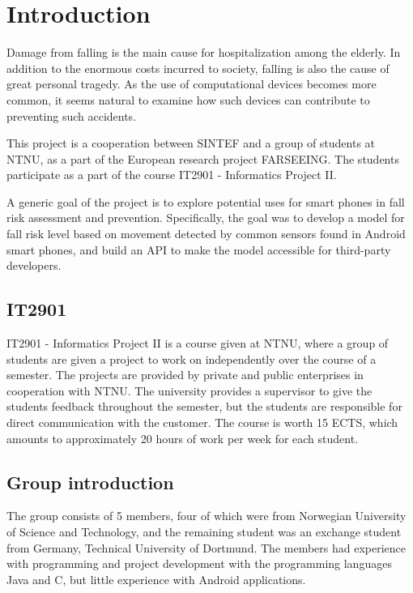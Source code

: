 \chapter{Introduction}

Damage from falling is the main cause for hospitalization among the elderly. In addition to the enormous costs incurred to society, falling is also the cause of great personal tragedy. As the use of computational devices becomes more common, it seems natural to examine how such devices can contribute to preventing such accidents.

This project is a cooperation between SINTEF and a group of students at NTNU, as a part of the European research project FARSEEING. The students participate as a part of the course IT2901 - Informatics Project II.

A generic goal of the project is to explore potential uses for smart phones in fall risk assessment and prevention. Specifically, the goal was to develop a model for fall risk level based on movement detected by common sensors found in Android smart phones, and build an API to make the model accessible for third-party developers.



\section{IT2901}
IT2901 - Informatics Project II is a course given at NTNU, where a group of students are given a project to work on independently over the course of a semester. The projects are provided by private and public enterprises in cooperation with NTNU. The university provides a supervisor to give the students feedback throughout the semester, but the students are responsible for direct communication with the customer. The course is worth 15 ECTS, which amounts to approximately 20 hours of work per week for each student. 

\section{Group introduction}
The group consists of 5 members, four of which were from Norwegian University of Science and Technology, and the remaining student was an exchange student from Germany, Technical University of Dortmund. The members had experience with programming and project development with the programming languages Java and C, but little experience with Android applications. 

